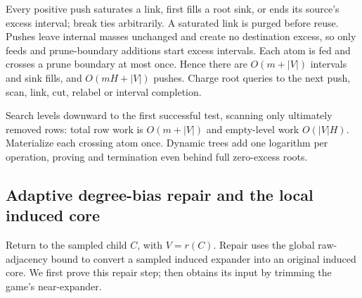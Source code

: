 \documentclass[11pt]{article}
\theoremstyle{remark}
\begin{document}
Every positive push saturates a link, first fills a root sink, or ends its
source's excess interval; break ties arbitrarily.
A saturated link is purged before reuse.
Pushes leave internal masses unchanged and create no destination excess, so only
feeds and prune-boundary additions start excess intervals.
Each atom is fed and crosses a prune boundary at most once.
Hence there are $O(m+|V|)$ intervals and sink fills, and $O(mH+|V|)$ pushes.
Charge root queries to the next push, scan, link, cut, relabel or interval
completion.

Search levels downward to the first successful test, scanning only ultimately
removed rows: total row work is $O(m+|V|)$ and empty-level work $O(|V|H)$.
Materialize each crossing atom once.
Dynamic trees add one logarithm per operation, proving
 and termination even behind full zero-excess roots.

\subsection{Adaptive degree-bias repair and the local induced core}

Return to the sampled child $C$, with $V=r(C)$.
Repair uses the global raw-adjacency bound to convert a sampled induced expander
into an original induced core.
We first prove this repair step;  then obtains its
input by trimming the game's near-expander.
\end{document}
